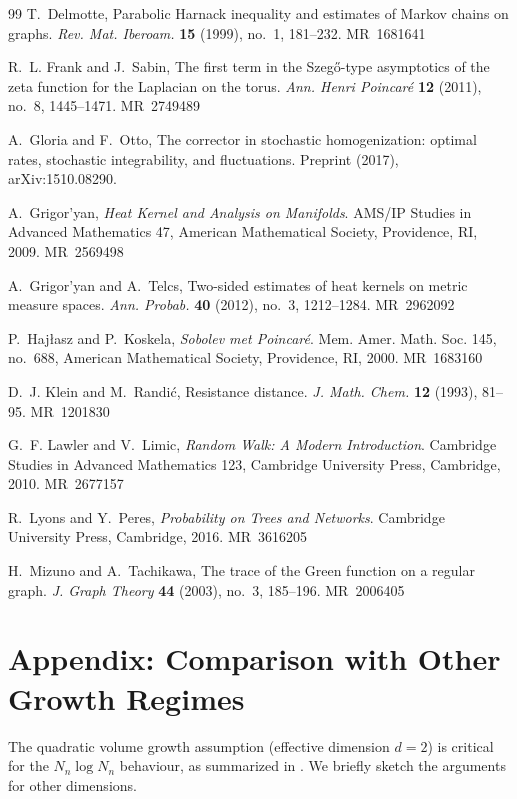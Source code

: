 \documentclass[reqno]{amsart}
\providecommand{\MR}[1]{\textsc{MR}~#1}
\numberwithin{equation}{section}
\theoremstyle{definition}
\theoremstyle{remark}
\begin{document}
\begin{thebibliography}{99}
T.~Delmotte, Parabolic Harnack inequality and estimates of Markov chains on graphs.
\emph{Rev. Mat. Iberoam.} \textbf{15} (1999), no.~1, 181--232.
\MR{1681641}

R.~L. Frank and J.~Sabin, The first term in the Szeg\H{o}-type asymptotics of the zeta function for the Laplacian on the torus.
\emph{Ann. Henri Poincar\'e} \textbf{12} (2011), no.~8, 1445--1471.
\MR{2749489}

A.~Gloria and F.~Otto, The corrector in stochastic homogenization: optimal rates, stochastic integrability, and fluctuations.
Preprint (2017), arXiv:1510.08290.

A.~Grigor'yan, \emph{Heat Kernel and Analysis on Manifolds}.
AMS/IP Studies in Advanced Mathematics 47, American Mathematical Society, Providence, RI, 2009.
\MR{2569498}

A.~Grigor'yan and A.~Telcs, Two-sided estimates of heat kernels on metric measure spaces.
\emph{Ann. Probab.} \textbf{40} (2012), no.~3, 1212--1284.
\MR{2962092}

P.~Hajłasz and P.~Koskela, \emph{Sobolev met Poincaré}.
Mem. Amer. Math. Soc. 145, no.~688, American Mathematical Society, Providence, RI, 2000.
\MR{1683160}

D.~J. Klein and M.~Randi{\'c}, Resistance distance.
\emph{J. Math. Chem.} \textbf{12} (1993), 81--95.
\MR{1201830}

G.~F. Lawler and V.~Limic, \emph{Random Walk: A Modern Introduction}.
Cambridge Studies in Advanced Mathematics 123, Cambridge University Press, Cambridge, 2010.
\MR{2677157}

R.~Lyons and Y.~Peres, \emph{Probability on Trees and Networks}.
Cambridge University Press, Cambridge, 2016.
\MR{3616205}

H.~Mizuno and A.~Tachikawa, The trace of the Green function on a regular graph.
\emph{J. Graph Theory} \textbf{44} (2003), no.~3, 185--196.
\MR{2006405}

\end{thebibliography}




\appendix

\section{Appendix: Comparison with Other Growth Regimes}\label{app:growth}
The quadratic volume growth assumption (effective dimension $d=2$) is critical for the $N_n \log N_n$ behaviour, as summarized in . We briefly sketch the arguments for other dimensions.
\end{document}
